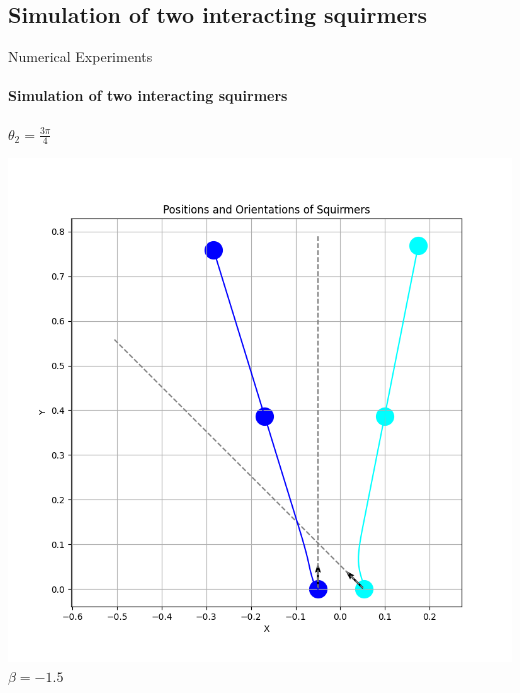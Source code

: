 \documentclass{beamer}
\begin{document}
\subsection{Simulation of two interacting squirmers}
\begin{frame}{Numerical Experiments}
    \framesubtitle{Simulation of two interacting squirmers}
    \begin{center}
        \textbf{$\theta_2 = \frac{3\pi}{4}$}
    \end{center}
    \begin{minipage}{0.49\textwidth}
        \centering
        \includegraphics[width=1\textwidth]{../../graphs/simulations/sim_sq_sq/betam1_5/3pi_4_.png}
        $\beta = -1.5$
    \end{minipage}
    \begin{minipage}{0.49\textwidth}
        \centering

\end{minipage}
\end{frame}
\end{document}
